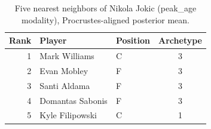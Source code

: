 \begin{table}[htbp]
  \centering\small
  \begin{tabular}{rllc}
    \toprule
    Rank & Player & Position & Archetype \\
    \midrule
    1 & Mark Williams & C & 3 \\
    2 & Evan Mobley & F & 3 \\
    3 & Santi Aldama & F & 3 \\
    4 & Domantas Sabonis & F & 3 \\
    5 & Kyle Filipowski & C & 1 \\
    \bottomrule
  \end{tabular}
  \caption{Five nearest neighbors of Nikola Jokic (peak_age modality), Procrustes-aligned posterior mean.}
  \label{tab:Nikola_Jokic_neighbors_peak_age}
\end{table}

